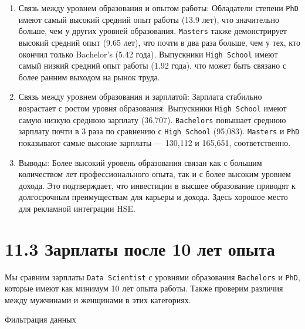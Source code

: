 \documentclass[
]{article}
\begin{document}
\begin{enumerate}
\def\labelenumi{\arabic{enumi}.}
\item
  Связь между уровнем образования и опытом работы: Обладатели степени
  \texttt{PhD} имеют самый высокий средний опыт работы (13.9 лет), что
  значительно больше, чем у других уровней образования.
  \texttt{Master\textquotesingle{}s} также демонстрирует высокий средний
  опыт (9.65 лет), что почти в два раза больше, чем у тех, кто окончил
  только Bachelor's (5.42 года). Выпускники \texttt{High\ School} имеют
  самый низкий средний опыт работы (1.92 года), что может быть связано с
  более ранним выходом на рынок труда.
\item
  Связь между уровнем образования и зарплатой: Зарплата стабильно
  возрастает с ростом уровня образования: Выпускники
  \texttt{High\ School} имеют самую низкую среднюю зарплату (36,707).
  \texttt{Bachelor\textquotesingle{}s} повышает среднюю зарплату почти в
  3 раза по сравнению с \texttt{High\ School} (95,083).
  \texttt{Master\textquotesingle{}s} и \texttt{PhD} показывают самые
  высокие зарплаты --- 130,112 и 165,651, соответственно.
\item
  Выводы: Более высокий уровень образования связан как с большим
  количеством лет профессионального опыта, так и с более высоким уровнем
  дохода. Это подтверждает, что инвестиции в высшее образование приводят
  к долгосрочным преимуществам для карьеры и дохода. Здесь хорошое место
  для рекламной интеграции HSE.
\end{enumerate}

\section{11.3 Зарплаты после 10 лет
опыта}\label{ux437ux430ux440ux43fux43bux430ux442ux44b-ux43fux43eux441ux43bux435-10-ux43bux435ux442-ux43eux43fux44bux442ux430}

Мы сравним зарплаты \texttt{Data\ Scientist} с уровнями образования
\texttt{Bachelor\textquotesingle{}s} и \texttt{PhD}, которые имеют как
минимум 10 лет опыта работы. Также проверим различия между мужчинами и
женщинами в этих категориях.

Фильтрация данных
\end{document}
